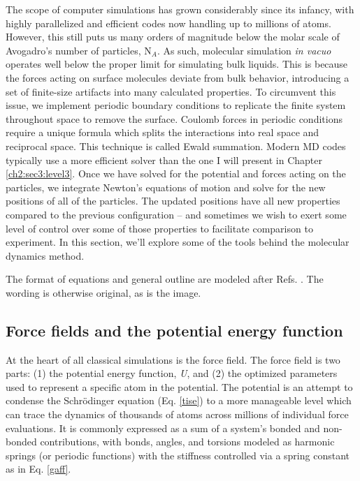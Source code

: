 \begin{theory}
 The scope of computer simulations has grown considerably since its infancy, with highly parallelized and
 efficient codes now handling up to millions of atoms. However, this still puts us many orders of magnitude 
 below the molar scale of Avogadro's number of particles, N$_{A}$. As such, molecular simulation \emph{in
 vacuo} operates well below the proper limit for simulating bulk liquids. This is because the forces acting 
 on surface molecules deviate from bulk behavior, introducing a set of finite-size artifacts into many 
 calculated properties. To circumvent this issue, we implement periodic boundary conditions to replicate the 
 finite system throughout space to remove the surface. Coulomb forces in periodic conditions require a unique 
 formula which splits the interactions into real space and reciprocal space. This technique is called Ewald
 summation. Modern MD codes typically use a more efficient solver than the one I will present in Chapter 
 \ref{ch2:sec3:level3}. Once we have solved for the potential and forces acting on the particles, we integrate
 Newton's equations of motion and solve for the new positions of all of the particles. The updated positions 
 have all new properties compared to the previous configuration -- and sometimes we wish to exert some level 
 of control over some of those properties to facilitate comparison to experiment. In this section, we'll 
 explore some of the tools behind the molecular dynamics method.
 
 The format of equations and general outline are modeled after Refs. \cite{tildesley,smit}. The wording is otherwise 
 original, as is the image.

 
  \subsection{\label{ch2:sec3:level2}Force fields and the potential energy function}
  At the heart of all classical simulations is the force field. The force field is two parts: (1) the potential
  energy function, \emph{U}, and (2) the optimized parameters used to represent a specific atom in the potential.
  The potential is an attempt to condense the Schr\"{o}dinger equation (Eq. \ref{tise}) to a more manageable
  level which can trace the dynamics of thousands of atoms across millions of individual force evaluations. 
  It is commonly expressed as a sum of a system's bonded and non-bonded contributions, with bonds, angles, and
  torsions modeled as harmonic springs (or periodic functions) with the stiffness controlled via a spring 
  constant as in Eq. \ref{gaff}.
  

\end{theory}
